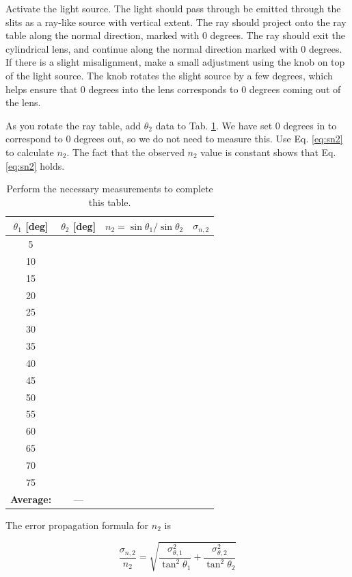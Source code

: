 \documentclass[12pt,twocolumn]{article}
\begin{document}
\noindent
Activate the light source.  The light should pass through be emitted through the slits as a ray-like source with vertical extent.  The ray should project onto the ray table along the normal direction, marked with 0 degrees.  The ray should exit the cylindrical lens, and continue along the normal direction marked with 0 degrees.  If there is a slight misalignment, make a small adjustment using the knob on top of the light source.  The knob rotates the slight source by a few degrees, which helps ensure that 0 degrees into the lens corresponds to 0 degrees coming out of the lens.

As you rotate the ray table, add $\theta_2$ data to Tab. \ref{tab:data}.  We have set 0 degrees in to correspond to 0 degrees out, so we do not need to measure this.  Use Eq. \ref{eq:sn2} to calculate $n_2$.  The fact that the observed $n_2$ value is constant shows that Eq. \ref{eq:sn2} holds.

\begin{table}[ht]
\footnotesize
\centering
\begin{tabular}{| c | c | c | c |}
\hline
\textbf{$\theta_1$} [deg] & \textbf{$\theta_2$} [deg] & \textbf{$n_2 = \sin\theta_1/\sin\theta_2$} & \textbf{$\sigma_{n,2}$} \\ \hline
5 & & & \\ \hline
10 & & & \\ \hline
15 & & & \\ \hline
20 & & & \\ \hline
25 & & & \\ \hline
30 & & & \\ \hline
35 & & & \\ \hline
40 & & & \\ \hline
45 & & & \\ \hline
50 & & & \\ \hline
55 & & & \\ \hline
60 & & & \\ \hline
65 & & & \\ \hline
70 & & & \\ \hline
75 & & & \\ \hline \hline
\textbf{Average:} & --- & & \\ \hline
\end{tabular}
\caption{\label{tab:data} Perform the necessary measurements to complete this table.}
\end{table}

The error propagation formula for $n_2$ is

\begin{equation}
\frac{\sigma_{n,2}}{n_2} = \sqrt{\frac{\sigma_{\theta,1}^2}{\tan^2\theta_1} + \frac{\sigma_{\theta,2}^2}{\tan^2\theta_2}} \label{eq:err}
\end{equation}
\end{document}
